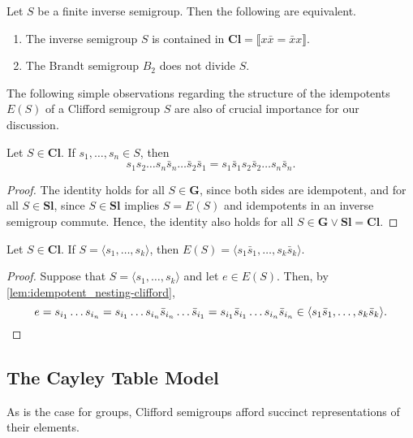 \documentclass[anonymous,letter,UKenglish,cleveref,autoref,thm-restate]{lipics-v2021}
\newcommand{\vG}{\ensuremath{\mathbf{G}}}
\newcommand{\vSl}{\ensuremath{\mathbf{Sl}}}
\newcommand{\vCl}{\ensuremath{\mathbf{Cl}}}
\newcommand{\vId}[1]{\ensuremath{\llbracket #1 \rrbracket}}
\theoremstyle{plain}
\theoremstyle{plain}
\begin{document}
\begin{lemma}\label{lem:characterization-clifford}
  Let $S$ be a finite inverse semigroup.
  Then the following are equivalent.
  \begin{enumerate}
    \item The inverse semigroup $S$ is contained in $\vCl = \vId{x\bar x = \bar x x}$.
    \item The Brandt semigroup $B_2$ does not divide $S$.
  \end{enumerate}
\end{lemma}

The following simple observations regarding the structure of the idempotents $E(S)$ of a Clifford semigroup $S$ are also of crucial importance for our discussion.

\begin{lemma}\label{lem:idempotent_nesting-clifford}
	Let $S \in \vCl$.
	If $s_1, \dotsc, s_n \in S$, then 
	\[
	s_1 s_2 \dotsc s_n \bar s_n \dotsc \bar s_2 \bar s_1 = s_1 \bar s_1 s_2 \bar s_2 \dotsc s_n \bar s_n.
	\]
\end{lemma}
\begin{proof}
	The identity holds for all $S \in \vG$, since both sides are idempotent, and for all $S \in \vSl$, since $S \in \vSl$ implies $S = E(S)$ and idempotents in an inverse semigroup commute.
	Hence, the identity also holds for all $S \in \vG \vee \vSl = \vCl$.
\end{proof}

\begin{lemma}\label{lem:idempotent_generators-clifford}
	Let $S \in \vCl$.
	If $S = \langle s_1, \dotsc, s_k \rangle$, then $E(S) = \langle s_1 \bar s_1, \dotsc, s_k \bar s_k \rangle$.
\end{lemma}
\begin{proof}
	Suppose that $S = \langle s_1, \dotsc, s_k \rangle$ and let $e \in E(S)$.
	Then, by \cref{lem:idempotent_nesting-clifford},  
	\[
	e = s_{i_1} \dotsc s_{i_n} = s_{i_1} \dotsc s_{i_n} \bar s_{i_n} \dotsc \bar s_{i_1} = s_{i_1} \bar s_{i_1} \dotsc s_{i_n} \bar s_{i_n} \in \langle s_1 \bar s_1, \dotsc, s_k \bar s_k \rangle.\qedhere
	\]
\end{proof}


\subsection{The Cayley Table Model}\label{sec:Clifford-CT}

As is the case for groups, Clifford semigroups afford succinct representations of their elements. 
\end{document}

